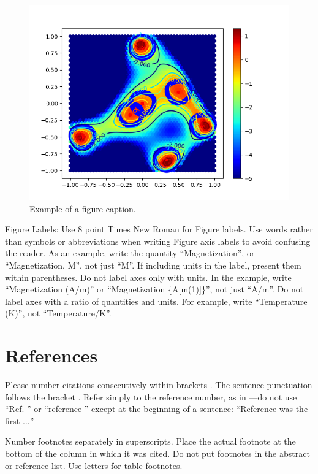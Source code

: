\documentclass[conference]{IEEEtran}
\begin{document}
\begin{figure}[htbp]
\centerline{\includegraphics[scale=0.5]{fig1}}
\caption{Example of a figure caption.}
\label{fig}
\end{figure}

Figure Labels: Use 8 point Times New Roman for Figure labels. Use words 
rather than symbols or abbreviations when writing Figure axis labels to 
avoid confusing the reader. As an example, write the quantity 
``Magnetization'', or ``Magnetization, M'', not just ``M''. If including 
units in the label, present them within parentheses. Do not label axes only 
with units. In the example, write ``Magnetization (A/m)'' or ``Magnetization 
\{A[m(1)]\}'', not just ``A/m''. Do not label axes with a ratio of 
quantities and units. For example, write ``Temperature (K)'', not 
``Temperature/K''.

\section*{References}

Please number citations consecutively within brackets \cite{b1}. The 
sentence punctuation follows the bracket \cite{b2}. Refer simply to the reference 
number, as in \cite{b3}---do not use ``Ref. \cite{b3}'' or ``reference \cite{b3}'' except at 
the beginning of a sentence: ``Reference \cite{b3} was the first $\ldots$''

Number footnotes separately in superscripts. Place the actual footnote at 
the bottom of the column in which it was cited. Do not put footnotes in the 
abstract or reference list. Use letters for table footnotes.
\end{document}
